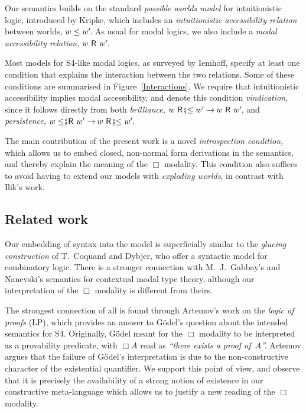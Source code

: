 \documentclass[submission,copyright,creativecommons,sharealike,backref=page]{eptcs}
\newcommand{\R}{\mathrel{\rlap{$\mkern.75mu\textsf{R}$}\hphantom{\subseteq}}}
\renewcommand{\:}{\mathop{\mkern3mu:\mkern3mu}}
\renewcommand{\.}{\mathop{\mkern3mu.\mkern3mu}}
\renewcommand{\;}{\mathop{;}}
\renewcommand{\,}{\mathop{,}}
\renewcommand{\r}{\mathrel{\rightarrow\mkern-1mu}}
\newcommand{\s}{\fatsemi}
\newcommand{\Rsle}{\mathrel{\R\mkern-4mu\s\mkern-4mu\le}}
\newcommand{\lesR}{\mathrel{\le\mkern-4mu\s\mkern-4mu\R}}
\theoremstyle{mystyle}
\begin{document}
Our semantics builds on the standard \emph{possible worlds model} for intuitionistic logic, introduced by Kripke\cite{Kripke65}, which includes an \emph{intuitionistic accessibility relation} between worlds, $w \le w'\mkern-3mu$.  As usual for modal logics, we also include a \emph{modal accessibility relation,} $w \R w'\mkern-3mu$.

Most models for S4-like modal logics, as surveyed by Iemhoff\cite{Iemhoff01}, specify at least one condition that explains the interaction between the two relations.  Some of these conditions are summarised in Figure~\ref{Interactions}.  We require that intuitionistic accessibility implies modal accessibility, and denote this condition \emph{vindication,} since it follows directly from both \emph{brilliance,} $w \Rsle w' \r w \R w'\mkern-3mu$, and \emph{persistence,} $w \lesR w' \r w \Rsle w'\mkern-3mu$.

The main contribution of the present work is a novel \emph{introspection condition,} which allows us to embed closed, non-normal form derivations in the semantics, and thereby explain the meaning of the $\Box$ modality.  This condition also suffices to avoid having to extend our models with \emph{exploding worlds}, in contrast with Ilik's work.


\subsection*{Related work}

Our embedding of syntax into the model is superficially similar to the \emph{glueing construction} of T.~Coquand and Dybjer\cite{CoquandD97}, who offer a syntactic model for combinatory logic.  There is a stronger connection with M.~J.~Gabbay's and Nanevski's\cite{GabbayN13} semantics for contextual modal type theory, although our interpretation of the $\Box$ modality is different from theirs.

The strongest connection of all is found through Artemov's\cite{Artemov01} work on the \emph{logic of proofs} (LP), which provides an answer to G{\"o}del's\cite{Godel33} question about the intended semantics for S4.  Originally, G{\"o}del meant for the $\Box$ modality to be interpreted as a provability predicate, with $\Box A$ read as \textsl{``there exists a proof of~$A$''.}  Artemov argues that the failure of G{\"o}del's interpretation is due to the non-constructive character of the existential quantifier.  We support this point of view, and observe that it is precisely the availability of a strong notion of existence in our constructive meta-language which allows us to justify a new reading of the $\Box$ modality.
\end{document}
